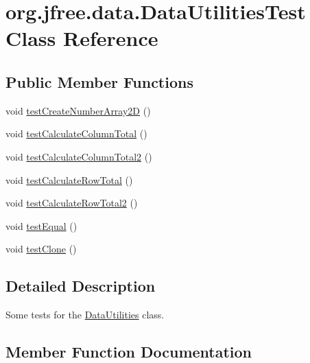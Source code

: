 \hypertarget{classorg_1_1jfree_1_1data_1_1_data_utilities_test}{}\section{org.\+jfree.\+data.\+Data\+Utilities\+Test Class Reference}
\label{classorg_1_1jfree_1_1data_1_1_data_utilities_test}
\subsection*{Public Member Functions}
\begin{DoxyCompactItemize}
\item 
void \mbox{\hyperlink{classorg_1_1jfree_1_1data_1_1_data_utilities_test_a07e42cd7a9d0ca755cf030cc1b14add8}{test\+Create\+Number\+Array2D}} ()
\item 
void \mbox{\hyperlink{classorg_1_1jfree_1_1data_1_1_data_utilities_test_af7d5bb781570cfd1ee791b385e694105}{test\+Calculate\+Column\+Total}} ()
\item 
void \mbox{\hyperlink{classorg_1_1jfree_1_1data_1_1_data_utilities_test_ab2a0dae8a706d0e28cb70bf667de0ccc}{test\+Calculate\+Column\+Total2}} ()
\item 
void \mbox{\hyperlink{classorg_1_1jfree_1_1data_1_1_data_utilities_test_aec1dd317d4314e6496ef3c12b3ce1473}{test\+Calculate\+Row\+Total}} ()
\item 
void \mbox{\hyperlink{classorg_1_1jfree_1_1data_1_1_data_utilities_test_ac3b41155cbe884e70838df15f021fee5}{test\+Calculate\+Row\+Total2}} ()
\item 
void \mbox{\hyperlink{classorg_1_1jfree_1_1data_1_1_data_utilities_test_a91b62b500e88d1e049ce3fff07e77e92}{test\+Equal}} ()
\item 
void \mbox{\hyperlink{classorg_1_1jfree_1_1data_1_1_data_utilities_test_af9579af9383e4810c3419b1cb1166081}{test\+Clone}} ()
\end{DoxyCompactItemize}


\subsection{Detailed Description}
Some tests for the \mbox{\hyperlink{classorg_1_1jfree_1_1data_1_1_data_utilities}{Data\+Utilities}} class. 

\subsection{Member Function Documentation}
\mbox{\label{classorg_1_1jfree_1_1data_1_1_data_utilities_test_af7d5bb781570cfd1ee791b385e694105}} 
